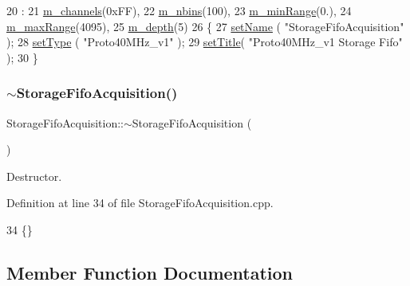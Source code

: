 \begin{DoxyCode}
20                                                  :
21   \hyperlink{classStorageFifoAcquisition_ae3563f586533ac15f48c7f9c8fea3e7f}{m\_channels}(0xFF),
22   \hyperlink{classStorageFifoAcquisition_af5f50ba5a71654324d96eddc4d578571}{m\_nbins}(100),
23   \hyperlink{classStorageFifoAcquisition_ad3cf1ef4173ffe14a0e86b7b8ec8d90b}{m\_minRange}(0.),
24   \hyperlink{classStorageFifoAcquisition_adbe54adb957ea13ae6ff9e56b7e398c8}{m\_maxRange}(4095),
25   \hyperlink{classStorageFifoAcquisition_a6bebf76cce0ccaae599c844a69ebd19d}{m\_depth}(5)
26 \{
27   \hyperlink{classObject_ae30fea75683c2d149b6b6d17c09ecd0c}{setName} ( \textcolor{stringliteral}{"StorageFifoAcquisition"} );
28   \hyperlink{classObject_aae534cc9d982bcb9b99fd505f2e103a5}{setType} ( \textcolor{stringliteral}{"Proto40MHz\_v1"} );
29   \hyperlink{classObject_a89557dbbad5bcaa02652f5d7fa35d20f}{setTitle}( \textcolor{stringliteral}{"Proto40MHz\_v1 Storage Fifo"} );
30 \}
\end{DoxyCode}
\mbox{\label{classStorageFifoAcquisition_acfa89ab91baa3dbd3a8651992c396cf3}} 
\subsubsection{\texorpdfstring{$\sim$\+Storage\+Fifo\+Acquisition()}{~StorageFifoAcquisition()}}
{\footnotesize\ttfamily Storage\+Fifo\+Acquisition\+::$\sim$\+Storage\+Fifo\+Acquisition (\begin{DoxyParamCaption}{ }\end{DoxyParamCaption})\hspace{0.3cm}{\ttfamily [virtual]}}



Destructor. 



Definition at line 34 of file Storage\+Fifo\+Acquisition.\+cpp.


\begin{DoxyCode}
34 \{\} 
\end{DoxyCode}


\subsection{Member Function Documentation}
\mbox{\label{classStorageFifoAcquisition_ab8ff708c3269e56312115df8351bbe24}} 
